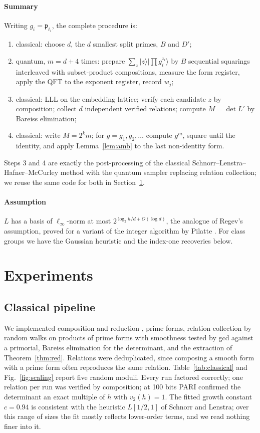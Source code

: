 \documentclass[conference]{IEEEtran}
\newcommand{\p}{\mathfrak{p}}
\begin{document}
\paragraph*{Summary} Writing $g_i=\p_{\ell_i}$, the complete procedure is:
\begin{enumerate}
\item classical: choose $d$, the $d$ smallest split primes, $B$ and $D'$;
\item quantum, $m=d+4$ times: prepare $\sum_{z}|z\rangle|\prod g_i^{z_i}\rangle$ by $B$ sequential squarings interleaved with subset-product compositions, measure the form register, apply the QFT to the exponent register, record $w_j$;
\item classical: LLL on the embedding lattice; verify each candidate $z$ by composition; collect $d$ independent verified relations; compute $M=\det L'$ by Bareiss elimination;
\item classical: write $M=2^km$; for $g=g_1,g_2,\dots$ compute $g^m$, square until the identity, and apply Lemma~\ref{lem:amb} to the last non-identity form.
\end{enumerate}
Steps 3 and 4 are exactly the post-processing of the classical Schnorr--Lenstra--Hafner--McCurley method with the quantum sampler replacing relation collection; we reuse the same code for both in Section~\ref{sec:exp}.

\paragraph*{Assumption} $L$ has a basis of $\ell_\infty$-norm at most $2^{\log_2h/d+O(\log d)}$, the analogue of Regev's assumption, proved for a variant of the integer algorithm by Pilatte \cite{pilatte2024}. For class groups we have the Gaussian heuristic and the index-one recoveries below.

\section{Experiments}\label{sec:exp}
\subsection{Classical pipeline}
We implemented composition and reduction \cite{cohen1993}, prime forms, relation collection by random walks on products of prime forms with smoothness tested by gcd against a primorial, Bareiss elimination for the determinant, and the extraction of Theorem~\ref{thm:red}. Relations were deduplicated, since composing a smooth form with a prime form often reproduces the same relation. Table~\ref{tab:classical} and Fig.~\ref{fig:scaling} report five random moduli. Every run factored correctly; one relation per run was verified by composition; at 100 bits PARI confirmed the determinant an exact multiple of $h$ with $v_2(h)=1$. The fitted growth constant $c=0.94$ is consistent with the heuristic $L[1/2,1]$ of Schnorr and Lenstra; over this range of sizes the fit mostly reflects lower-order terms, and we read nothing finer into it.
\end{document}
